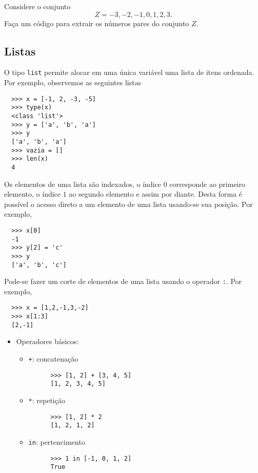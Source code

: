 \documentclass[12pt]{article}
\begin{document}
\begin{exr}
  Considere o conjunto
  \begin{equation}
    Z = {-3, -2, -1, 0, 1, 2, 3}.
  \end{equation}
  Faça um código {\python} para extrair os números pares do conjunto $Z$.
\end{exr}

\subsection{Listas}

O tipo {\python} \verb+list+ permite alocar em uma única variável uma lista de itens ordenada. Por exemplo, observemos as seguintes listas
\begin{lstlisting}
  >>> x = [-1, 2, -3, -5]
  >>> type(x)
  <class 'list'>
  >>> y = ['a', 'b', 'a']
  >>> y
  ['a', 'b', 'a']
  >>> vazia = []
  >>> len(x)
  4
\end{lstlisting}

Os elementos de uma lista são indexados, o índice $0$ corresponde ao primeiro elemento, o índice $1$ ao segundo elemento e assim por diante. Desta forma é possível o acesso direto a um elemento de uma lista usando-se sua posição. Por exemplo,
\begin{lstlisting}
  >>> x[0]
  -1
  >>> y[2] = 'c'
  >>> y
  ['a', 'b', 'c']
\end{lstlisting}
Pode-se fazer um corte de elementos de uma lista usando o operador \verb+:+. Por exemplo,
\begin{lstlisting}
  >>> x = [1,2,-1,3,-2]
  >>> x[1:3]
  [2,-1]
\end{lstlisting}

\begin{itemize}
\item Operadores básicos:
  \begin{itemize}
  \item[] \lstinline-+-: concatenação
    \begin{lstlisting}
      >>> [1, 2] + [3, 4, 5]
      [1, 2, 3, 4, 5]
    \end{lstlisting}
  \item[] \lstinline+*+: repetição
    \begin{lstlisting}
      >>> [1, 2] * 2
      [1, 2, 1, 2]
    \end{lstlisting}
  \item[] \lstinline+in+: pertencimento
    \begin{lstlisting}
      >>> 1 in [-1, 0, 1, 2]
      True
    \end{lstlisting}
  \end{itemize}
\end{itemize}
\end{document}
